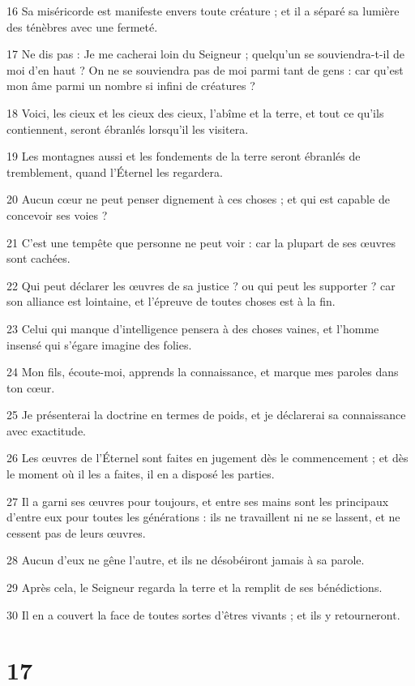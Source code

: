 \par 16 Sa miséricorde est manifeste envers toute créature ; et il a séparé sa lumière des ténèbres avec une fermeté.
\par 17 Ne dis pas : Je me cacherai loin du Seigneur ; quelqu'un se souviendra-t-il de moi d'en haut ? On ne se souviendra pas de moi parmi tant de gens : car qu'est mon âme parmi un nombre si infini de créatures ?
\par 18 Voici, les cieux et les cieux des cieux, l'abîme et la terre, et tout ce qu'ils contiennent, seront ébranlés lorsqu'il les visitera.
\par 19 Les montagnes aussi et les fondements de la terre seront ébranlés de tremblement, quand l'Éternel les regardera.
\par 20 Aucun cœur ne peut penser dignement à ces choses ; et qui est capable de concevoir ses voies ?
\par 21 C'est une tempête que personne ne peut voir : car la plupart de ses œuvres sont cachées.
\par 22 Qui peut déclarer les œuvres de sa justice ? ou qui peut les supporter ? car son alliance est lointaine, et l'épreuve de toutes choses est à la fin.
\par 23 Celui qui manque d'intelligence pensera à des choses vaines, et l'homme insensé qui s'égare imagine des folies.
\par 24 Mon fils, écoute-moi, apprends la connaissance, et marque mes paroles dans ton cœur.
\par 25 Je présenterai la doctrine en termes de poids, et je déclarerai sa connaissance avec exactitude.
\par 26 Les œuvres de l'Éternel sont faites en jugement dès le commencement ; et dès le moment où il les a faites, il en a disposé les parties.
\par 27 Il a garni ses œuvres pour toujours, et entre ses mains sont les principaux d'entre eux pour toutes les générations : ils ne travaillent ni ne se lassent, et ne cessent pas de leurs œuvres.
\par 28 Aucun d'eux ne gêne l'autre, et ils ne désobéiront jamais à sa parole.
\par 29 Après cela, le Seigneur regarda la terre et la remplit de ses bénédictions.
\par 30 Il en a couvert la face de toutes sortes d'êtres vivants ; et ils y retourneront.

\chapter{17}

